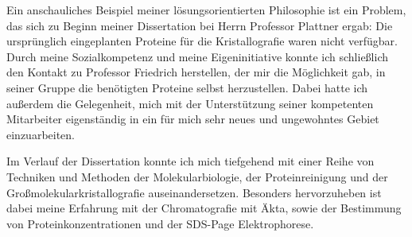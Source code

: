 
Ein anschauliches Beispiel meiner lösungsorientierten Philosophie ist ein Problem, das sich zu Beginn meiner Dissertation bei Herrn Professor Plattner ergab: Die ursprünglich eingeplanten Proteine für die Kristallografie waren nicht verfügbar. Durch meine Sozialkompetenz und meine Eigeninitiative konnte ich schließlich den Kontakt zu Professor Friedrich herstellen, der mir die Möglichkeit gab, in seiner Gruppe die benötigten Proteine selbst herzustellen. Dabei hatte ich außerdem die Gelegenheit, mich mit der Unterstützung seiner kompetenten Mitarbeiter eigenständig in ein für mich sehr neues und ungewohntes Gebiet einzuarbeiten. \par
Im Verlauf der Dissertation konnte ich mich tiefgehend mit einer Reihe von Techniken und Methoden der Molekularbiologie, der Proteinreinigung und der Großmolekularkristallografie auseinandersetzen. Besonders hervorzuheben ist dabei meine Erfahrung mit der Chromatografie mit Äkta, sowie der Bestimmung von Proteinkonzentrationen und der SDS-Page Elektrophorese. %
